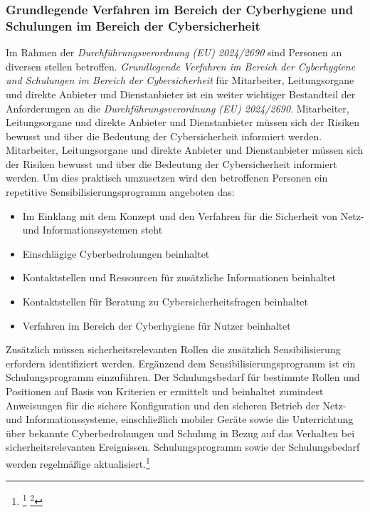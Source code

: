 \documentclass[11pt,a4paper,hidelinks]{article}   %
\begin{document}
            \subsubsection{Grundlegende Verfahren im Bereich der Cyberhygiene und Schulungen im Bereich der Cybersicherheit}
            Im Rahmen der \emph{Durchführungsverordnung (EU) 2024/2690} sind Personen an diversen stellen betroffen. \emph{Grundlegende Verfahren im Bereich der Cyberhygiene und Schulungen im Bereich der Cybersicherheit} für Mitarbeiter, Leitungsorgane und direkte Anbieter und Dienstanbieter ist ein weiter wichtiger Bestandteil der Anforderungen an die \emph{Durchführungsverordnung (EU) 2024/2690}. Mitarbeiter, Leitungsorgane und direkte Anbieter und Dienstanbieter müssen sich der Risiken bewusst und über die Bedeutung der Cybersicherheit informiert werden. Mitarbeiter, Leitungsorgane und direkte Anbieter und Dienstanbieter müssen sich der Risiken bewusst und über die Bedeutung der Cybersicherheit informiert werden. Um dies praktisch umzusetzen wird den betroffenen Personen ein repetitive Sensibilisierungsprogramm angeboten das:
            \begin{itemize}
                \item Im Einklang mit dem Konzept und den Verfahren für die Sicherheit von Netz- und Informationssystemen steht
                \item Einschlägige Cyberbedrohungen beinhaltet
                \item Kontaktstellen und Ressourcen für zusätzliche Informationen beinhaltet
                \item Kontaktstellen für Beratung zu Cybersicherheitsfragen beinhaltet
                \item Verfahren im Bereich der Cyberhygiene für Nutzer beinhaltet
            \end{itemize} Zusätzlich müssen sicherheitsrelevanten Rollen die zusätzlich Sensibilisierung erfordern identifiziert werden. Ergänzend dem Sensibilisierungsprogramm ist ein Schulungsprogramm einzuführen. Der Schulungsbedarf für bestimmte Rollen und Positionen auf Basis von Kriterien er ermittelt und beinhaltet zumindest Anweisungen für die sichere Konfiguration und den sicheren Betrieb der Netz- und Informationssysteme, einschließlich mobiler Geräte sowie die Unterrichtung über bekannte Cyberbedrohungen und Schulung in Bezug auf das Verhalten bei sicherheitsrelevanten Ereignissen. Schulungsprogramm sowie der Schulungsbedarf werden regelmäßige aktualisiert.\footnote{
                \footcite[Vgl. Nummer 8,][, Anhang]{EU2024-2690}
                \footcite[Vgl. §30 Absatz 2, Nummer 7,][]{NIS2UmsuCG} %
            }
\end{document}
